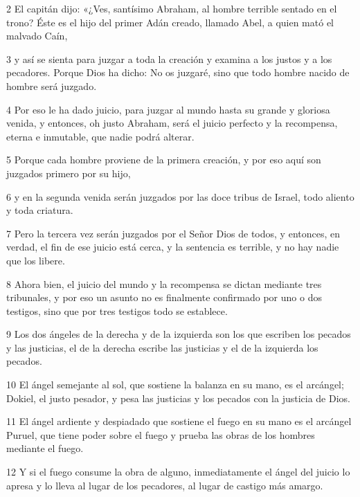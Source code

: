 \par 2 El capitán dijo: «¿Ves, santísimo Abraham, al hombre terrible sentado en el trono? Éste es el hijo del primer Adán creado, llamado Abel, a quien mató el malvado Caín,

\par 3 y así se sienta para juzgar a toda la creación y examina a los justos y a los pecadores. Porque Dios ha dicho: No os juzgaré, sino que todo hombre nacido de hombre será juzgado.

\par 4 Por eso le ha dado juicio, para juzgar al mundo hasta su grande y gloriosa venida, y entonces, oh justo Abraham, será el juicio perfecto y la recompensa, eterna e inmutable, que nadie podrá alterar.

\par 5 Porque cada hombre proviene de la primera creación, y por eso aquí son juzgados primero por su hijo,

\par 6 y en la segunda venida serán juzgados por las doce tribus de Israel, todo aliento y toda criatura.

\par 7 Pero la tercera vez serán juzgados por el Señor Dios de todos, y entonces, en verdad, el fin de ese juicio está cerca, y la sentencia es terrible, y no hay nadie que los libere.

\par 8 Ahora bien, el juicio del mundo y la recompensa se dictan mediante tres tribunales, y por eso un asunto no es finalmente confirmado por uno o dos testigos, sino que por tres testigos todo se establece.

\par 9 Los dos ángeles de la derecha y de la izquierda son los que escriben los pecados y las justicias, el de la derecha escribe las justicias y el de la izquierda los pecados.

\par 10 El ángel semejante al sol, que sostiene la balanza en su mano, es el arcángel; Dokiel, el justo pesador, y pesa las justicias y los pecados con la justicia de Dios.

\par 11 El ángel ardiente y despiadado que sostiene el fuego en su mano es el arcángel Puruel, que tiene poder sobre el fuego y prueba las obras de los hombres mediante el fuego.

\par 12 Y si el fuego consume la obra de alguno, inmediatamente el ángel del juicio lo apresa y lo lleva al lugar de los pecadores, al lugar de castigo más amargo.

